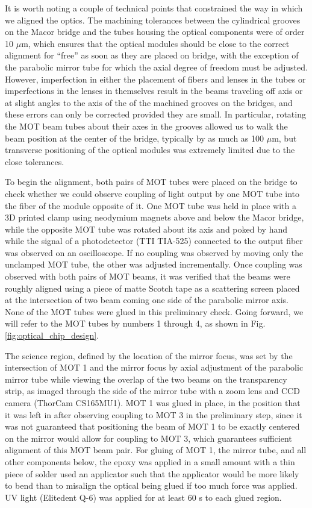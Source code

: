 It is worth noting a couple of technical points that constrained the way in which we aligned the optics. The machining tolerances between the cylindrical grooves on the Macor bridge and the tubes housing the optical components were of order 10 $\mu \mathrm{m}$, which ensures that the optical modules should be close to the correct alignment for ``free” as soon as they are placed on bridge, with the exception of the parabolic mirror tube for which the axial degree of freedom must be adjusted. However, imperfection in either the placement of fibers and lenses in the tubes or imperfections in the lenses in themselves result in the beams traveling off axis or at slight angles to the axis of the of the machined grooves on the bridges, and these errors can only be corrected provided they are small. In particular, rotating the MOT beam tubes about their axes in the grooves allowed us to walk the beam position at the center of the bridge, typically by as much as 100 $\mu \mathrm{m}$, but transverse positioning of the optical modules was extremely limited due to the close tolerances. 

To begin the alignment, both pairs of MOT tubes were placed on the bridge to check whether we could observe coupling of light output by one MOT tube into the fiber of the module opposite of it. One MOT tube was held in place with a 3D printed clamp using neodymium magnets above and below the Macor bridge, while the opposite MOT tube was rotated about its axis and poked by hand while the signal of a photodetector (TTI TIA-525) connected to the output fiber was observed on an oscilloscope. If no coupling was observed by moving only the unclamped MOT tube, the other was adjusted incrementally. Once coupling was observed with both pairs of MOT beams, it was verified that the beams were roughly aligned using a piece of matte Scotch tape as a scattering screen placed at the intersection of two beam coming one side of the parabolic mirror axis. None of the MOT tubes were glued in this preliminary check. Going forward, we will refer to the MOT tubes by numbers 1 through 4, as shown in Fig. \ref{fig:optical_chip_design}.

The science region, defined by the location of the mirror focus, was set by the intersection of MOT 1 and the mirror focus by axial adjustment of the parabolic mirror tube while viewing the overlap of the two beams on the transparency strip, as imaged through the side of the mirror tube with a zoom lens and CCD camera (ThorCam CS165MU1). MOT 1 was glued in place, in the position that it was left in after observing coupling to MOT 3 in the preliminary step, since it was not guaranteed that positioning the beam of MOT 1 to be exactly centered on the mirror would allow for coupling to MOT 3, which guarantees sufficient alignment of this MOT beam pair. For gluing of MOT 1, the mirror tube, and all other components below, the epoxy was applied in a small amount with a thin piece of solder used an applicator such that the applicator would be more likely to bend than to misalign the optical being glued if too much force was applied. UV light (Elitedent Q-6) was applied for at least 60 s to each glued region.

